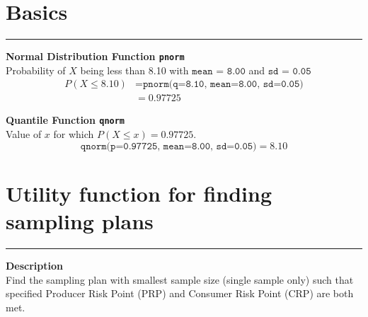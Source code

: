
\section{Basics}
\noindent\rule[\linienAbstand]{\linewidth}{\linienDicke}
\textbf{Normal Distribution Function \texttt{pnorm}}\\
Probability of $X$ being less than 8.10 with $\texttt{mean = 8.00}$ and $\texttt{sd = 0.05}$
\begin{equation*}
  \begin{split}
    P(X \leq 8.10) &= \texttt{pnorm(q=8.10, mean=8.00, sd=0.05)}\\
    &= 0.97725
  \end{split}
\end{equation*}

\textbf{Quantile Function \texttt{qnorm}}\\
Value of $x$ for which $P(X \leq x) = 0.97725$.
\begin{equation*}
  \texttt{qnorm(p=0.97725, mean=8.00, sd=0.05)} = 8.10
\end{equation*}

\section{Utility function for finding sampling plans}
\noindent\rule[\linienAbstand]{\linewidth}{\linienDicke}
\textbf{Description}\\
Find the sampling plan with smallest sample size (single sample only) such that specified Producer Risk Point (PRP) and Consumer Risk Point (CRP) are both met.

